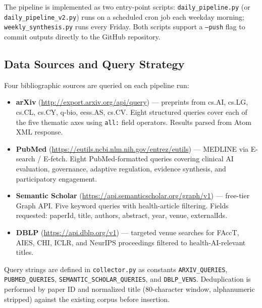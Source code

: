 The pipeline is implemented as two entry-point scripts:
\texttt{daily\_pipeline.py} (or \texttt{daily\_pipeline\_v2.py}) runs on a
scheduled cron job each weekday morning; \texttt{weekly\_synthesis.py} runs
every Friday. Both scripts support a \texttt{--push} flag to commit outputs
directly to the GitHub repository.


\subsection{Data Sources and Query Strategy}
\label{sec:app_sources}

Four bibliographic sources are queried on each pipeline run:

\begin{itemize}[itemsep=0.2em]
\item \textbf{arXiv} (\url{http://export.arxiv.org/api/query}) — preprints from
  cs.AI, cs.LG, cs.CL, cs.CY, q-bio, eess.AS, cs.CV. Eight structured queries
  cover each of the five thematic axes using \texttt{all:} field operators.
  Results parsed from Atom XML response.

\item \textbf{PubMed} (\url{https://eutils.ncbi.nlm.nih.gov/entrez/eutils}) — MEDLINE
  via E-search / E-fetch. Eight PubMed-formatted queries covering clinical AI
  evaluation, governance, adaptive regulation, evidence synthesis, and
  participatory engagement.

\item \textbf{Semantic Scholar} (\url{https://api.semanticscholar.org/graph/v1})
  — free-tier Graph API. Five keyword queries with health-article filtering.
  Fields requested: paperId, title, authors, abstract, year, venue, externalIds.

\item \textbf{DBLP} (\url{https://api.dblp.org/v1}) — targeted venue searches for
  FAccT, AIES, CHI, ICLR, and NeurIPS proceedings filtered to health-AI-relevant
  titles.
\end{itemize}

Query strings are defined in \texttt{collector.py} as constants
\texttt{ARXIV\_QUERIES}, \texttt{PUBMED\_QUERIES},
\texttt{SEMANTIC\_SCHOLAR\_QUERIES}, and \texttt{DBLP\_VENS}. Deduplication
is performed by paper ID and normalized title (80-character window, alphanumeric
stripped) against the existing corpus before insertion.

